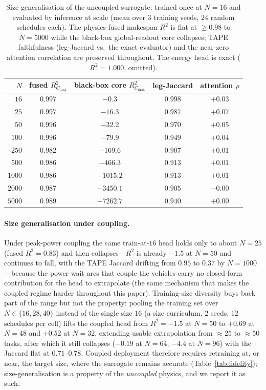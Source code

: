 \documentclass[11pt]{article}
\begin{document}
\begin{table}[t]
\centering\small
\caption{Size generalisation of the uncoupled surrogate: trained once at $N{=}16$ and
evaluated by inference at scale (mean over $3$ training seeds, $24$ random schedules each).
The physics-fused makespan $R^2$ is flat at $\geq0.98$ to $N{=}5000$ while the black-box
global-readout core collapses; TAPE faithfulness (leg-Jaccard vs.\ the exact evaluator) and the
near-zero attention correlation are preserved throughout. The energy head is exact
($R^2=1.000$, omitted).}
\label{tab:generalize}
\setlength{\tabcolsep}{6pt}
\begin{tabular}{rcccc}
\toprule
$N$ & fused $R^2_{C_{\max}}$ & black-box core $R^2_{C_{\max}}$ & leg-Jaccard & attention $\rho$\\
\midrule
$16$   & $0.997$ & $-0.3$     & $0.998$ & $+0.03$\\
$25$   & $0.997$ & $-16.3$    & $0.987$ & $+0.07$\\
$50$   & $0.996$ & $-32.2$    & $0.970$ & $+0.05$\\
$100$  & $0.996$ & $-79.9$    & $0.949$ & $+0.04$\\
$250$  & $0.982$ & $-169.6$   & $0.907$ & $+0.01$\\
$500$  & $0.986$ & $-466.3$   & $0.913$ & $+0.01$\\
$1000$ & $0.986$ & $-1015.2$  & $0.913$ & $+0.01$\\
$2000$ & $0.987$ & $-3450.1$  & $0.905$ & $-0.00$\\
$5000$ & $0.989$ & $-7262.7$  & $0.940$ & $+0.00$\\
\bottomrule
\end{tabular}
\end{table}

\paragraph{Size generalisation under coupling.} Under peak-power coupling the same
train-at-$16$ head holds only to about $N{=}25$ (fused $R^2=0.83$) and then collapses---$R^2$
is already $-1.5$ at $N{=}50$ and continues to fall, with the TAPE Jaccard drifting from
$0.95$ to $0.37$ by $N{=}1000$---because the power-wait arcs that couple the vehicles carry no
closed-form contribution for the head to extrapolate (the same mechanism that makes the
coupled regime harder throughout this paper). Training-size diversity buys back part of the
range but not the property: pooling the training set over $N\in\{16,28,40\}$ instead of the
single size $16$ (a size curriculum, $2$ seeds, $12$ schedules per cell) lifts the coupled
head from $R^2=-1.5$ at $N{=}50$ to $+0.69$ at $N{=}48$ and $+0.52$ at $N{=}32$, extending
usable extrapolation from ${\approx}25$ to ${\approx}50$ tasks, after which it still collapses
($-0.19$ at $N{=}64$, $-4.4$ at $N{=}96$) with the Jaccard flat at $0.71$--$0.78$. Coupled
deployment therefore requires retraining at, or near, the target size, where the surrogate
remains accurate (Table~\ref{tab:fidelity}); size-generalisation is a property of the
\emph{uncoupled} physics, and we report it as such.
\end{document}
